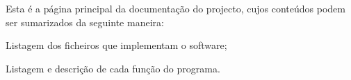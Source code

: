 Esta é a página principal da documentação do projecto, cujos conteúdos podem ser sumarizados da seguinte maneira\+:


\begin{DoxyEnumerate}
\item Listagem dos ficheiros que implementam o software;
\item Listagem e descrição de cada função do programa. 
\end{DoxyEnumerate}